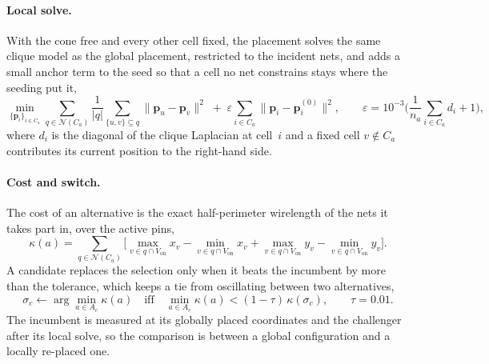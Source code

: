 \paragraph{Local solve.}
With the cone free and every other cell fixed, the placement solves the
same clique model as the global placement, restricted to the incident
nets, and adds a small anchor term to the seed so that a cell no net
constrains stays where the seeding put it,
\begin{equation}
  \min_{\{\mathbf p_i\}_{i\in C_a}}
  \sum_{q\in\mathcal N(C_a)} \frac{1}{|q|}
  \sum_{\{u,v\}\subseteq q}\|\mathbf p_u-\mathbf p_v\|^2
  \;+\;\varepsilon\sum_{i\in C_a}\|\mathbf p_i-\mathbf p_i^{(0)}\|^2 ,
  \qquad
  \varepsilon = 10^{-3}\Big(\frac{1}{n_a}\sum_{i\in C_a} d_i+1\Big),
  \label{eq:local}
\end{equation}
where $d_i$ is the diagonal of the clique Laplacian at cell~$i$ and a
fixed cell $v\notin C_a$ contributes its current position to the
right-hand side.

\paragraph{Cost and switch.}
The cost of an alternative is the exact half-perimeter wirelength of the
nets it takes part in, over the active pins,
\begin{equation}
  \kappa(a)=\sum_{q\in\mathcal N(C_a)}\Big[
    \max_{v\in q\cap V_{\mathrm{on}}} x_v-\min_{v\in q\cap V_{\mathrm{on}}} x_v
    +\max_{v\in q\cap V_{\mathrm{on}}} y_v-\min_{v\in q\cap V_{\mathrm{on}}} y_v
  \Big].
  \label{eq:cost}
\end{equation}
A candidate replaces the selection only when it beats the incumbent by
more than the tolerance, which keeps a tie from oscillating between two
alternatives,
\begin{equation}
  \sigma_c \leftarrow \arg\min_{a\in A_c}\kappa(a)
  \quad\text{iff}\quad
  \min_{a\in A_c}\kappa(a) < (1-\tau)\,\kappa(\sigma_c),
  \qquad \tau=0.01 .
  \label{eq:switch}
\end{equation}
The incumbent is measured at its globally placed coordinates and the
challenger after its local solve, so the comparison is between a global
configuration and a locally re-placed one.

